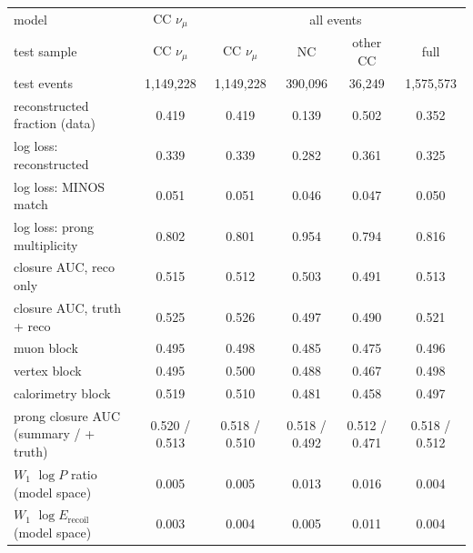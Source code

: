 \begin{tabular}{lccccc}
\toprule
model & CC $\nu_\mu$ & \multicolumn{4}{c}{all events} \\
 test sample & CC $\nu_\mu$ & CC $\nu_\mu$ & NC & other CC & full \\
\midrule
test events & 1,149,228 & 1,149,228 & 390,096 & 36,249 & 1,575,573 \\
reconstructed fraction (data) & 0.419 & 0.419 & 0.139 & 0.502 & 0.352 \\
log loss: reconstructed & 0.339 & 0.339 & 0.282 & 0.361 & 0.325 \\
log loss: MINOS match & 0.051 & 0.051 & 0.046 & 0.047 & 0.050 \\
log loss: prong multiplicity & 0.802 & 0.801 & 0.954 & 0.794 & 0.816 \\
\midrule
closure AUC, reco only & 0.515 & 0.512 & 0.503 & 0.491 & 0.513 \\
closure AUC, truth + reco & 0.525 & 0.526 & 0.497 & 0.490 & 0.521 \\
\quad muon block & 0.495 & 0.498 & 0.485 & 0.475 & 0.496 \\
\quad vertex block & 0.495 & 0.500 & 0.488 & 0.467 & 0.498 \\
\quad calorimetry block & 0.519 & 0.510 & 0.481 & 0.458 & 0.497 \\
prong closure AUC (summary / + truth) & 0.520 / 0.513 & 0.518 / 0.510 & 0.518 / 0.492 & 0.512 / 0.471 & 0.518 / 0.512 \\
\midrule
$W_1$ $\log P$ ratio (model space) & 0.005 & 0.005 & 0.013 & 0.016 & 0.004 \\
$W_1$ $\log E_\mathrm{recoil}$ (model space) & 0.003 & 0.004 & 0.005 & 0.011 & 0.004 \\
\bottomrule
\end{tabular}
